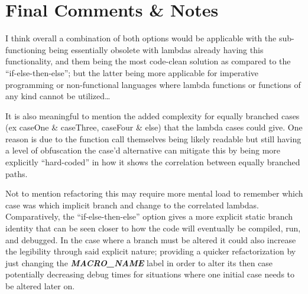 \documentclass{article}
\newcommand{\textbfit}[1]{\textbf{\textit{#1}}}
\begin{document}
    \newpage
    \section{Final Comments \& Notes}
        I think overall a combination of both options would be applicable with the sub-functioning being essentially obsolete with lambdas already having this functionality, and them being the most code-clean solution as compared to the ``if-else-then-else''; but the latter being more applicable for imperative programming or non-functional languages where lambda functions or functions of any kind cannot be utilized\dots

    \bigskip
        It is also meaningful to mention the added complexity for equally branched cases (ex caseOne \& caseThree, caseFour \& else) that the lambda cases could give. One reason is due to the function call themselves being likely readable but still having a level of obfuscation the case'd alternative can mitigate this by being more explicitly ``hard-coded'' in how it shows the correlation between equally branched paths.

    \bigskip
        Not to mention refactoring this may require more mental load to remember which case was which implicit branch and change to the correlated lambdas. Comparatively, the ``if-else-then-else'' option gives a more explicit static branch identity that can be seen closer to how the code will eventually be compiled, run, and debugged. In the case where a branch must be altered it could also increase the legibility through said explicit nature; providing a quicker refactorization by just changing the \textbfit{MACRO\_NAME} label in order to alter its then case potentially decreasing debug times for situations where one initial case needs to be altered later on.

    
\end{document}
